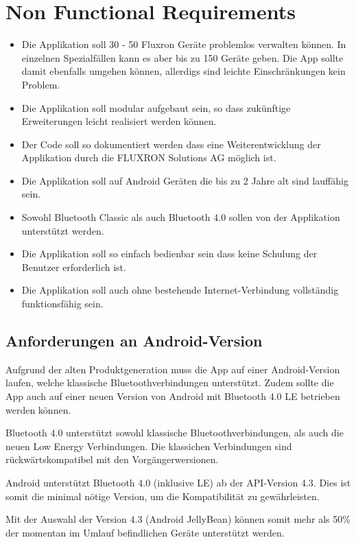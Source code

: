 
\section{Non Functional Requirements}
\label{sec:Non Functional Requirements}

\begin{itemize}
\item Die Applikation soll 30 - 50 Fluxron Geräte problemlos verwalten können. In einzelnen Spezialfällen kann es aber bis zu 150 Geräte geben. Die App sollte damit ebenfalls umgehen können, allerdigs sind leichte Einschränkungen kein Problem.
\item Die Applikation soll modular aufgebaut sein, so dass zukünftige Erweiterungen leicht realisiert werden können.
\item Der Code soll so dokumentiert werden dass eine Weiterentwicklung der Applikation durch die FLUXRON Solutions AG möglich ist.
\item Die Applikation soll auf Android Geräten die bis zu 2 Jahre alt sind lauffähig sein.
\item Sowohl Bluetooth Classic als auch Bluetooth 4.0 sollen von der Applikation unterstützt werden.
\item Die Applikation soll so einfach bedienbar sein dass keine Schulung der Benutzer erforderlich ist.
\item Die Applikation soll auch ohne bestehende Internet-Verbindung vollständig funktionsfähig sein.
\end{itemize}


\subsection{Anforderungen an Android-Version}
\label{subsec:Non Functional Requirements}
Aufgrund der alten Produktgeneration muss die App auf einer Android-Version laufen, welche klassische Bluetoothverbindungen unterstützt. Zudem sollte die App auch auf einer neuen Version von Android mit Bluetooth 4.0 \ac{LE} betrieben werden können.

Bluetooth 4.0 unterstützt sowohl klassische Bluetoothverbindungen, als auch die neuen Low Energy Verbindungen. Die klassichen Verbindungen sind rückwärtskompatibel mit den Vorgängerwersionen.\cite{bt_standard}

Android unterstützt Bluetooth 4.0 (inklusive \ac{LE}) ab der API-Version 4.3\cite{bt_android}. Dies ist somit die minimal nötige Version, um die Kompatibilität zu gewährleisten.

Mit der Auswahl der Version 4.3 (Android JellyBean) können somit mehr als 50\% der momentan im Umlauf \cite{android_distribution} befindlichen Geräte unterstützt werden.